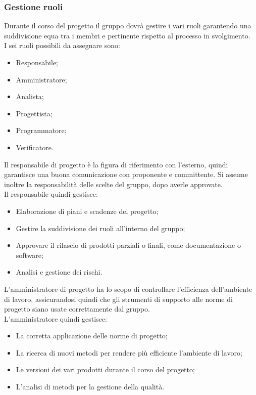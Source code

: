 	\subsubsection{Gestione ruoli}
	Durante il corso del progetto il gruppo dovrà gestire i vari ruoli garantendo una suddivisione equa tra i membri e pertinente rispetto al processo in svolgimento.\\
	I sei ruoli possibili da assegnare sono:
    \begin{itemize}
    	\item Responsabile;
    	\item Amministratore;
    	\item Analista;
    	\item Progettista;
    	\item Programmatore;
    	\item Verificatore.
    \end{itemize}
	Il responsabile di progetto è la figura di riferimento con l'esterno, quindi  garantisce una buona comunicazione con proponente e committente. Si assume inoltre la responsabilità delle scelte del gruppo, dopo averle approvate.\\
	Il responsabile quindi gestisce:
	\begin{itemize}
		\item Elaborazione di piani e scadenze del progetto;
		\item Gestire la suddivisione dei ruoli all'interno del gruppo;
		\item Approvare il rilascio di prodotti parziali o finali, come documentazione o software;
		\item Analisi e gestione dei rischi.
	\end{itemize}
	L'amministratore di progetto ha lo scopo di controllare l'efficienza dell'ambiente di lavoro, assicurandosi quindi che gli strumenti di supporto alle norme di progetto siano usate correttamente dal gruppo.\\
	L'amministratore quindi gestisce:
	\begin{itemize}
		\item La corretta applicazione delle norme di progetto;
		\item La ricerca di nuovi metodi per rendere più efficiente l'ambiente di lavoro;
		\item Le versioni dei vari prodotti durante il corso del progetto;
		\item L'analisi di metodi per la gestione della qualità.
	\end{itemize}
